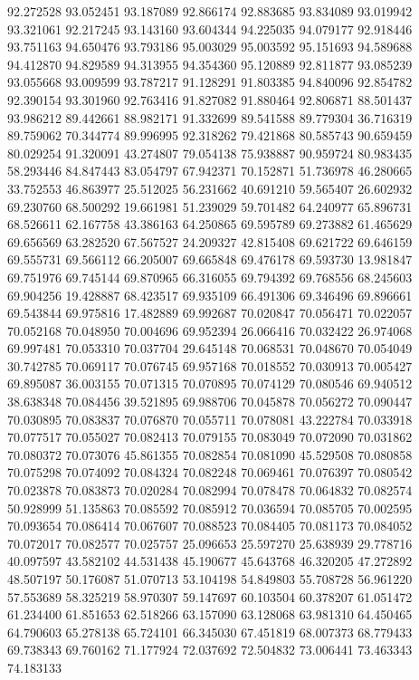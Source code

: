 92.272528
93.052451
93.187089
92.866174
92.883685
93.834089
93.019942
93.321061
92.217245
93.143160
93.604344
94.225035
94.079177
92.918446
93.751163
94.650476
93.793186
95.003029
95.003592
95.151693
94.589688
94.412870
94.829589
94.313955
94.354360
95.120889
92.811877
93.085239
93.055668
93.009599
93.787217
91.128291
91.803385
94.840096
92.854782
92.390154
93.301960
92.763416
91.827082
91.880464
92.806871
88.501437
93.986212
89.442661
88.982171
91.332699
89.541588
89.779304
36.716319
89.759062
70.344774
89.996995
92.318262
79.421868
80.585743
90.659459
80.029254
91.320091
43.274807
79.054138
75.938887
90.959724
80.983435
58.293446
84.847443
83.054797
67.942371
70.152871
51.736978
46.280665
33.752553
46.863977
25.512025
56.231662
40.691210
59.565407
26.602932
69.230760
68.500292
19.661981
51.239029
59.701482
64.240977
65.896731
68.526611
62.167758
43.386163
64.250865
69.595789
69.273882
61.465629
69.656569
63.282520
67.567527
24.209327
42.815408
69.621722
69.646159
69.555731
69.566112
66.205007
69.665848
69.476178
69.593730
13.981847
69.751976
69.745144
69.870965
66.316055
69.794392
69.768556
68.245603
69.904256
19.428887
68.423517
69.935109
66.491306
69.346496
69.896661
69.543844
69.975816
17.482889
69.992687
70.020847
70.056471
70.022057
70.052168
70.048950
70.004696
69.952394
26.066416
70.032422
26.974068
69.997481
70.053310
70.037704
29.645148
70.068531
70.048670
70.054049
30.742785
70.069117
70.076745
69.957168
70.018552
70.030913
70.005427
69.895087
36.003155
70.071315
70.070895
70.074129
70.080546
69.940512
38.638348
70.084456
39.521895
69.988706
70.045878
70.056272
70.090447
70.030895
70.083837
70.076870
70.055711
70.078081
43.222784
70.033918
70.077517
70.055027
70.082413
70.079155
70.083049
70.072090
70.031862
70.080372
70.073076
45.861355
70.082854
70.081090
45.529508
70.080858
70.075298
70.074092
70.084324
70.082248
70.069461
70.076397
70.080542
70.023878
70.083873
70.020284
70.082994
70.078478
70.064832
70.082574
50.928999
51.135863
70.085592
70.085912
70.036594
70.085705
70.002595
70.093654
70.086414
70.067607
70.088523
70.084405
70.081173
70.084052
70.072017
70.082577
70.025757
25.096653
25.597270
25.638939
29.778716
40.097597
43.582102
44.531438
45.190677
45.643768
46.320205
47.272892
48.507197
50.176087
51.070713
53.104198
54.849803
55.708728
56.961220
57.553689
58.325219
58.970307
59.147697
60.103504
60.378207
61.051472
61.234400
61.851653
62.518266
63.157090
63.128068
63.981310
64.450465
64.790603
65.278138
65.724101
66.345030
67.451819
68.007373
68.779433
69.738343
69.760162
71.177924
72.037692
72.504832
73.006441
73.463343
74.183133
